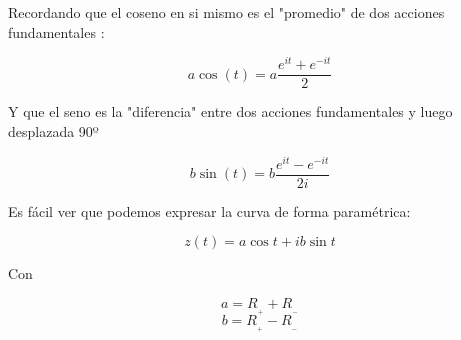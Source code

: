 \documentclass[preview]{standalone}
\begin{document}
\begin{center}
Recordando que el coseno en si mismo es el "promedio" de dos acciones fundamentales :

$$a \cos(t)=a\frac{e^{it}+e^{-it}}{2}$$


Y que el seno es la "diferencia" entre dos acciones fundamentales y luego desplazada 90º

$$b \sin(t)=b\frac{e^{it}-e^{-it}}{2i}$$


Es fácil ver que podemos expresar la curva  de forma paramétrica:

$$z(t)=a\cos{t}+i b \sin{t}$$ 

Con 

$$a=R_{_+}+R_{_-}$$ 
$$b=R_{_+}-R_{_-}$$
\end{center}
\end{document}
